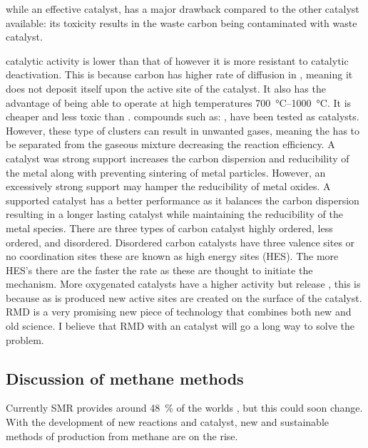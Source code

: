 \begin{multicols}{2}

 while an effective catalyst, has a major drawback compared to the other catalyst available: its toxicity results in the waste carbon being contaminated with waste  catalyst.
 
 catalytic activity is lower than that of  however it is more resistant to catalytic deactivation.
This is because carbon has higher rate of diffusion in , meaning it does not deposit itself upon the active site of the catalyst.
It also has the advantage of being able to operate at high temperatures \SIrange{700}{1000}{\celsius}.
It is cheaper and less toxic than .
 compounds such as: \ce{[Fe(CO)5]}, \ce{[Fe(cp)2]} have been tested as catalysts.
However, these type of clusters can result in unwanted gases, meaning the  has to be separated from the gaseous mixture decreasing the reaction efficiency.
A catalyst was strong support increases the carbon dispersion and reducibility of the metal along with preventing sintering of metal particles.
However, an excessively strong support may hamper the reducibility of metal oxides.
A supported catalyst has a better performance as it balances the carbon dispersion resulting in a longer lasting catalyst while maintaining the reducibility of the metal species.
There are three types of carbon catalyst highly ordered, less ordered, and disordered.
Disordered carbon catalysts have three valence sites or no coordination sites these are known as high energy sites (HES).
The more HES’s there are the faster the rate as these are thought to initiate the mechanism.
More oxygenated catalysts have a higher activity but release , this is because as  is produced new active sites are created on the surface of the catalyst.
RMD is a very promising new piece of technology that combines both new and old science.
I believe that RMD with an  catalyst will go a long way to solve the  problem.

\subsection{Discussion of methane methods}%
\label{sub:discussion_of_methane_methods}
Currently SMR provides around \SI{48}{\percent} of the worlds \cite{sbn2020}, but this could soon change.
With the development of new reactions and catalyst, new and sustainable methods of  production from methane are on the rise.


\end{multicols}

